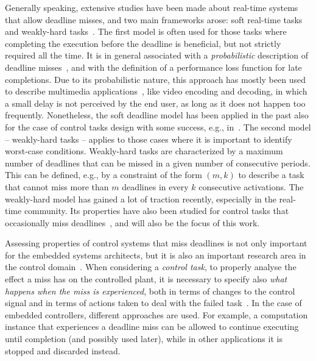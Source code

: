 Generally speaking, extensive studies have been made about real-time systems that allow deadline misses, and two main frameworks arose: soft real-time tasks~\cite{buttazzo2005soft} and weakly-hard tasks~\cite{Bernat:2001}.
The first model is often used for those tasks where completing the execution before the deadline is beneficial, but not strictly required all the time.
It is in general associated with a \emph{probabilistic} description of deadline misses~\cite{fontanelli2013continuous,Heemels:2016a,Jiang:2016,kim2005exact}, and with the definition of a performance loss function for late completions.
Due to its probabilistic nature, this approach has mostly been used to describe multimedia applications~\cite{Cucinotta:2010}, like video encoding and decoding, in which a small delay is not perceived by the end user, as long as it does not happen too frequently.
Nonetheless, the soft deadline model has been applied in the past also for the case of control tasks design with some success, e.g., in~\cite{caccamo2002handling, cervin2005control, fontanelli2013soft,fontanelli2013continuous, fontanelli2015optimal}.
The second model -- weakly-hard tasks -- applies to those cases where it is important to identify worst-case conditions. 
Weakly-hard tasks are characterized by a maximum number of deadlines that can be missed in a given number of consecutive periods. 
This can be defined, e.g., by a constraint of the form $(m, k)$ to describe a task that cannot miss more than $m$ deadlines in every $k$ consecutive activations.
The weakly-hard model has gained a lot of traction recently, especially in the real-time community. 
Its properties have also been studied for control tasks that occasionally miss deadlines~\cite{ramanathan1999overload, Frehse:2014, Pazzaglia:2018, Maggio:2020}, and will also be the focus of this work.

Assessing properties of control systems that miss deadlines is not only important for the embedded systems architects, but it is also an important research area in the control domain~\cite{Cervin:2005, Linsenmayer:2017, Chakraborty:2018, pazzaglia2021adaptive}.
When considering a \emph{control task}, to properly analyse the effect a miss has on the controlled plant, it is necessary to specify also \emph{what happens when the miss is experienced}, both in terms of changes to the control signal and in terms of actions taken to deal with the failed task~\cite{Pazzaglia:2019}.
In the case of embedded controllers, different approaches are used. 
For example, a computation instance that experiences a deadline miss can be allowed to continue executing until completion (and possibly used later), while in other applications it is stopped and discarded instead.

